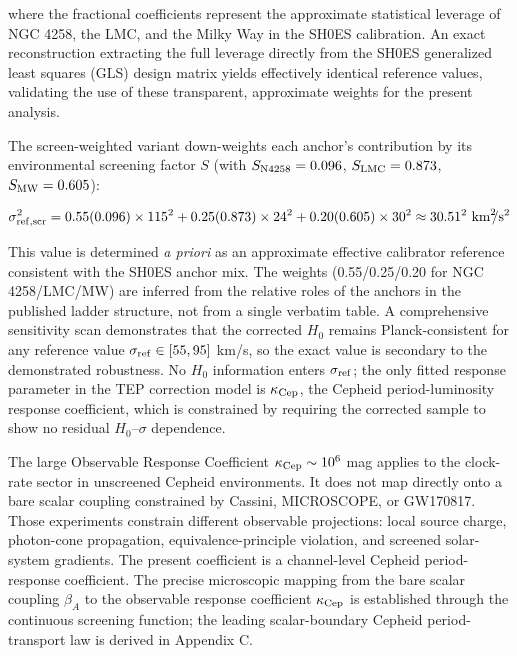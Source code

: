 \documentclass[
]{article}
\begin{document}
where the fractional coefficients represent the approximate statistical
leverage of NGC 4258, the LMC, and the Milky Way in the SH0ES
calibration. An exact reconstruction extracting the full leverage
directly from the SH0ES generalized least squares (GLS) design matrix
yields effectively identical reference values, validating the use of
these transparent, approximate weights for the present analysis.

The screen-weighted variant down-weights each anchor's contribution by
its environmental screening factor \(S\) (with \(S_{\rm N4258}=0.096\),
\(S_{\rm LMC}=0.873\), \(S_{\rm MW}=0.605\)):

\begin{equation}
\sigma_{\rm ref,scr}^2 = 0.55(0.096) \times 115^2 + 0.25(0.873) \times 24^2 + 0.20(0.605) \times 30^2 \approx 30.51^2 \text{ km}^2\!\!/\text{s}^2
\end{equation}

This value is determined \emph{a priori} as an approximate effective
calibrator reference consistent with the SH0ES anchor mix. The weights
(0.55/0.25/0.20 for NGC 4258/LMC/MW) are inferred from the relative
roles of the anchors in the published ladder structure, not from a
single verbatim table. A comprehensive sensitivity scan demonstrates
that the corrected \(H_0\) remains Planck-consistent for any reference
value \(\sigma_{\rm ref} \in [55, 95]\) km/s, so the exact value is
secondary to the demonstrated robustness. No \(H_0\) information enters
\(\sigma_{\rm ref}\); the only fitted response parameter in the TEP
correction model is \(\kappa_{\rm Cep}\), the Cepheid period-luminosity
response coefficient, which is constrained by requiring the corrected
sample to show no residual \(H_0\)--\(\sigma\) dependence.

The large Observable Response Coefficient \(\kappa_{\rm Cep} \sim 10^6\)
mag applies to the clock-rate sector in unscreened Cepheid environments.
It does not map directly onto a bare scalar coupling constrained by
Cassini, MICROSCOPE, or GW170817. Those experiments constrain different
observable projections: local source charge, photon-cone propagation,
equivalence-principle violation, and screened solar-system gradients.
The present coefficient is a channel-level Cepheid period-response
coefficient. The precise microscopic mapping from the bare scalar
coupling \(\beta_A\) to the observable response coefficient
\(\kappa_{\rm Cep}\) is established through the continuous screening
function; the leading scalar-boundary Cepheid period-transport law is
derived in Appendix C.
\end{document}
